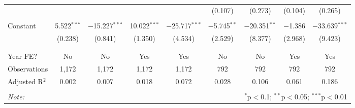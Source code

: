 \begin{sidewaystable}[!htbp]
\begin{tabular}{@{\extracolsep{0pt}}lcccccccc}
  &  &  &  &  & (0.107) & (0.273) & (0.104) & (0.265) \\ 
  & & & & & & & & \\ 
 Constant & 5.522$^{***}$ & $-$15.227$^{***}$ & 10.022$^{***}$ & $-$25.717$^{***}$ & $-$5.745$^{**}$ & $-$20.351$^{**}$ & $-$1.386 & $-$33.639$^{***}$ \\ 
  & (0.238) & (0.841) & (1.350) & (4.534) & (2.529) & (8.377) & (2.968) & (9.423) \\ 
  & & & & & & & & \\ 
\hline \\[-1.8ex] 
Year FE? & No & No & Yes & Yes & No & No & Yes & Yes \\ 
Observations & 1,172 & 1,172 & 1,172 & 1,172 & 792 & 792 & 792 & 792 \\ 
Adjusted R$^{2}$ & 0.002 & 0.007 & 0.018 & 0.072 & 0.028 & 0.106 & 0.061 & 0.186 \\ 
\hline 
\hline \\[-1.8ex] 
\textit{Note:}  & \multicolumn{8}{r}{$^{*}$p$<$0.1; $^{**}$p$<$0.05; $^{***}$p$<$0.01} \\ 
\end{tabular} 
\end{sidewaystable} 
